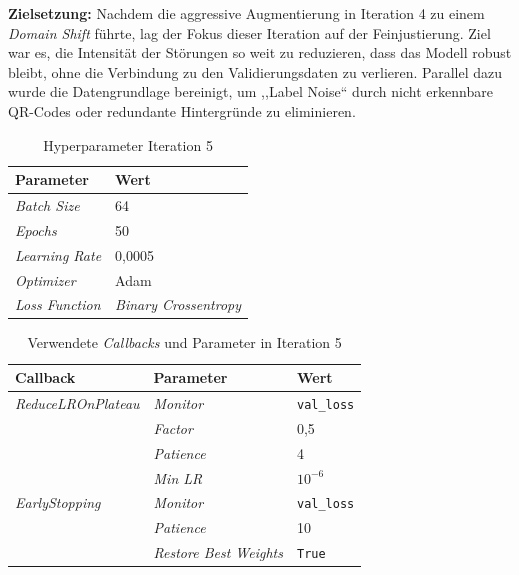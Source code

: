 \documentclass[
    a4paper,        %
    11pt,           %
    ngerman,        %
    parskip=half,   %
    listof=totoc,   %
    bibliography=totoc %
]{scrartcl}
\begin{document}
\textbf{Zielsetzung:} Nachdem die aggressive Augmentierung in Iteration 4 zu einem \textit{Domain Shift} führte, lag der Fokus dieser Iteration auf der Feinjustierung. Ziel war es, die Intensität der Störungen so weit zu reduzieren, dass das Modell robust bleibt, ohne die Verbindung zu den Validierungsdaten zu verlieren. Parallel dazu wurde die Datengrundlage bereinigt, um ,,Label Noise`` durch nicht erkennbare QR-Codes oder redundante Hintergründe zu eliminieren.

\begin{table}[H]
    \centering
    \caption{Hyperparameter Iteration 5}
    \label{tab:hyperparams_iter5}
    \begin{tabular}{ll}
        \toprule
        \textbf{Parameter} & \textbf{Wert} \\
        \midrule
        \textit{Batch Size} & 64 \\
        \textit{Epochs} & 50 \\
        \textit{Learning Rate} & 0,0005 \\
        \textit{Optimizer} & Adam \\
        \textit{Loss Function} & \textit{Binary Crossentropy} \\
        \bottomrule
    \end{tabular}
\end{table}

\begin{table}[H]
    \centering
    \caption{Verwendete \textit{Callbacks} und Parameter in Iteration 5}
    \label{tab:callbacks_iter5}
    \begin{tabular}{lll}
        \toprule
        \textbf{Callback} & \textbf{Parameter} & \textbf{Wert} \\
        \midrule
        \textit{ReduceLROnPlateau} & \textit{Monitor} & \texttt{val\_loss} \\
                          & \textit{Factor} & 0,5 \\
                          & \textit{Patience} & 4 \\
                          & \textit{Min LR} & $10^{-6}$ \\
        \midrule
        \textit{EarlyStopping}     & \textit{Monitor} & \texttt{val\_loss} \\
                          & \textit{Patience} & 10 \\
                          & \textit{Restore Best Weights} & \texttt{True} \\
        \bottomrule
    \end{tabular}
\end{table}
\end{document}
